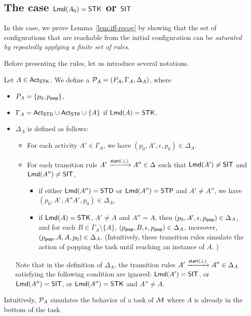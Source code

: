 

\subsection{The case ${\sf Lmd}(A_0) = \mathsf{STK}$ or $\mathsf{SIT}$}\label{sec:lmamass-stk}

In this case, we prove Lemma~\ref{lem:iff-recog} by showing that the set of configurations that are reachable from the initial configuration can be \emph{saturated by repeatedly applying a finite set of rules}. 

Before presenting the rules, let us introduce several notations. 

Let $A \in {\sf Act}_{\sf STK}$. 
We define a {\PDS} ${\mathcal{P} }_{A} = (P_A, \Gamma_{A}, \Delta_{A})$, where 
\begin{itemize}
\item $P_A = \{p_0, p_{\mathsf{pop}}\}$, 
\item $\Gamma_{A} = {\sf Act}_{{\sf STD}} \cup {\sf Act}_{{\sf STP}} \cup \{A\}$ if ${\sf Lmd}(A) = {\sf STK}$.
\item $\Delta_{A}$ is defined as follows: 
\begin{itemize}
%
\item For each activity $A' \in \Gamma_A $, we have $(p_0, A', \epsilon, p_0) \in \Delta_{A}$.
%
\item For each transition rule $A' \xrightarrow{{\mathsf{start} }(\bot)} A'' \in \Delta$ such that ${\sf Lmd}(A') \neq {\sf SIT}$ and ${\sf Lmd}(A'') \neq  {\sf SIT}$, 
\begin{itemize}
    \item if either ${\sf Lmd}(A'') = \mathsf{STD}$ or ${\sf Lmd}(A'') = {\sf STP}$ and $A' \neq A''$, we have $(p_0, A', A''A', p_0) \in \Delta_{A}$,    
    \item if ${\sf Lmd}(A) = {\sf STK}$, $A' \neq A$ and $A'' = A$, then $(p_0, A', \epsilon, p_{\mathsf{pop}}) \in \Delta_{A}$, and for each $B \in \Gamma_{A} \setminus \{A\}$, $(p_{\mathsf{pop}}, B, \epsilon, p_{\mathsf{pop}}) \in \Delta_{A}$, moreover, $(p_{\mathsf{pop}}, A, A, p_0) \in \Delta_{A}$. (Intuitively, these transition rules simulate the action of popping the task until reaching an instance of $A$. )
\end{itemize}
\end{itemize}
Note that in the definition of $\Delta_{A}$, the transition rules $A' \xrightarrow{{\mathsf{start} }(\bot)} A'' \in \Delta_A$ satisfying the following condition are ignored: ${\sf Lmd}(A') = {\sf SIT}$, or ${\sf Lmd}(A'') = {\sf SIT}$, or ${\sf Lmd}(A'') = {\sf STK}$ and $A'' \neq A$. 
\end{itemize}
Intuitively, ${\mathcal{P} }_{A}$ simulates the behavior of a task of ${\mathcal{M} }$ where $A$ is already in the bottom of the task. 


